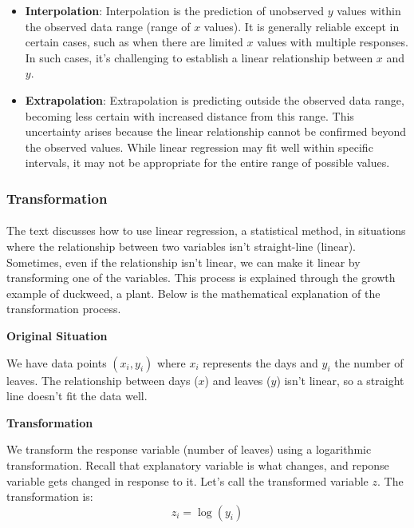 \documentclass{article}
\begin{document}
\begin{itemize}
    \item \textbf{Interpolation}: Interpolation is the prediction of unobserved $y$ values within the observed data range (range of $x$ values). It is generally reliable except in certain cases, such as when there are limited $x$ values with multiple responses. In such cases, it's challenging to establish a linear relationship between $x$ and $y$.

    \item \textbf{Extrapolation}: Extrapolation is predicting outside the observed data range, becoming less certain with increased distance from this range. This uncertainty arises because the linear relationship cannot be confirmed beyond the observed values. While linear regression may fit well within specific intervals, it may not be appropriate for the entire range of possible values.
    
\end{itemize}

\subsubsection{Transformation}
\paragraph{}
The text discusses how to use linear regression, a statistical method, in situations where the relationship between two variables isn't straight-line (linear). Sometimes, even if the relationship isn't linear, we can make it linear by transforming one of the variables. This process is explained through the growth example of duckweed, a plant.
Below is the mathematical explanation of the transformation process. \hfill \break

\textbf{Original Situation} \hfill \break

We have data points $(x_i, y_i)$ where $x_i$ represents the days and $y_i$ the number of leaves. The relationship between days ($x$) and leaves ($y$) isn't linear, so a straight line doesn't fit the data well. \hfill \break

\textbf{Transformation} \hfill \break

We transform the response variable (number of leaves) using a logarithmic transformation. Recall that explanatory variable is what changes, and reponse variable gets changed in response to it. Let's call the transformed variable $z$. The transformation is: 
\begin{equation}
z_i = \log(y_i)
\end{equation}
\end{document}
